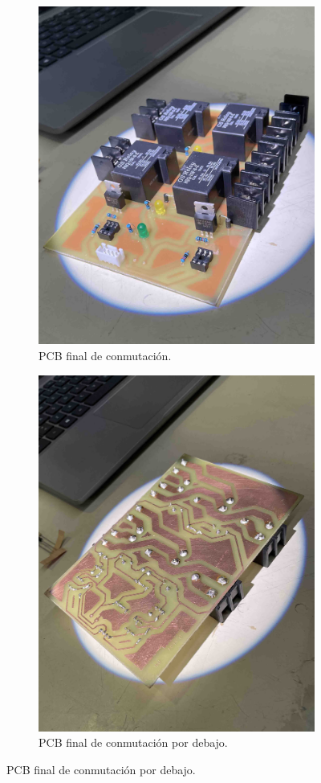 \begin{figure}[H]

\begin{subfigure}{0.5\textwidth}
\includegraphics[width=0.9\linewidth]{hardware/IMG_8220.jpg} 
\caption{PCB final de conmutación.}
\label{fig:conm-fin}
\end{subfigure}
\begin{subfigure}{0.5\textwidth}
\includegraphics[width=0.9\linewidth]{hardware/IMG_8221.jpg}
\caption{PCB final de conmutación por debajo.}
\label{fig:conm-inf}
\end{subfigure}


\end{figure}
